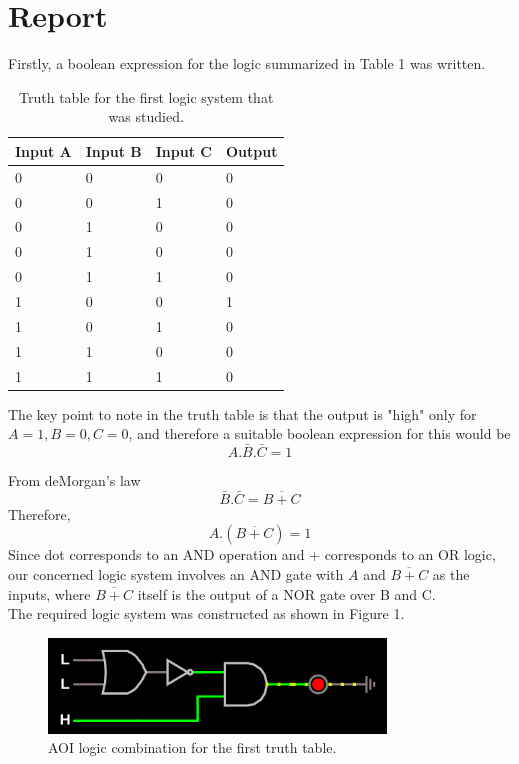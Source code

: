 \documentclass{article}
\begin{document}
	\section*{Report}
	Firstly, a boolean expression for the logic summarized in Table 1 was written.
	\begin{table}[H]
		\centering
		\begin{tabular}{|l|l|l|l|}
			\hline
			Input A & Input B & Input C & Output\\
			\hline
			0 & 0 & 0 & 0\\
			0 & 0 & 1 & 0\\
			0 &1 &0& 0\\
			0 & 1 & 0 & 0\\
			0 &1 & 1 & 0\\
			1 & 0 & 0 & 1\\
			1 &0 & 1 &0\\
			1 &1 &0 &0\\
			1 &1 &1 &0\\
			\hline
		\end{tabular}
	\caption{Truth table for the first logic system that was studied.}
	\end{table}
	
	The key point to note in the truth table is that the output is "high" only for $A=1, B=0, C=0$, and therefore a suitable boolean expression for this would be $$ A. \bar{B} .\bar{C} = 1$$
	
	From deMorgan's law $$ \bar{B}.\bar{C} = \overline{B+C}$$
	Therefore,
	$$ A.(\overline{B+C}) = 1$$
	Since dot corresponds to an AND operation and + corresponds to an OR logic, our concerned logic system involves an AND gate with $A$ and $\overline{B+C}$ as the inputs, where $\overline{B+C}$ itself is the output of a NOR gate over B and C.\\
	
	The required logic system was constructed as shown in Figure 1.
	
	\begin{figure}[H]
		\centering
		\includegraphics[width=0.8\textwidth]{AOI_1.png}
		\caption{AOI logic combination for the first truth table.}
	\end{figure}
	
\end{document}
